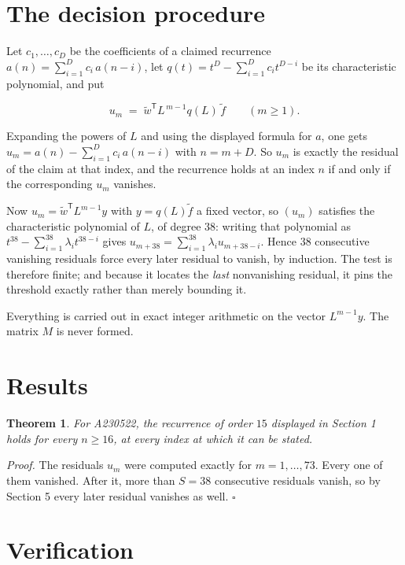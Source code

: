 \documentclass[11pt]{article}
\newtheorem{theorem}{Theorem}
\theoremstyle{definition}
\begin{document}
\section{The decision procedure}

Let $c_1,\dots,c_D$ be the coefficients of a claimed recurrence $a(n) = \sum_{i=1}^{D} c_i\,a(n-i)$, let $q(t) = t^{D} - \sum_{i=1}^{D} c_i t^{D-i}$ be its characteristic polynomial, and put

\[u_m \;=\; \tilde w^{\mathsf T} L^{\,m-1} q(L)\,\tilde f \qquad (m \ge 1).\]

Expanding the powers of $L$ and using the displayed formula for $a$, one gets $u_m = a(n) - \sum_{i=1}^{D} c_i\,a(n-i)$ with $n = m + D$. So $u_m$ is exactly the residual of the claim at that index, and the recurrence holds at an index $n$ if and only if the corresponding $u_m$ vanishes.

Now $u_m = \tilde w^{\mathsf T} L^{m-1} y$ with $y = q(L)\tilde f$ a fixed vector, so $(u_m)$ satisfies the characteristic polynomial of $L$, of degree $38$: writing that polynomial as $t^{38} - \sum_{i=1}^{38} \lambda_i t^{38-i}$ gives $u_{m+38} = \sum_{i=1}^{38} \lambda_i u_{m+38-i}$. Hence $38$ consecutive vanishing residuals force every later residual to vanish, by induction. The test is therefore finite; and because it locates the {\itshape last} nonvanishing residual, it pins the threshold exactly rather than merely bounding it.

Everything is carried out in exact integer arithmetic on the vector $L^{m-1}y$. The matrix $M$ is never formed.

\section{Results}

\begin{theorem} For A230522, the recurrence of order $15$ displayed in Section 1 holds for every $n \ge 16$, at every index at which it can be stated.\end{theorem}

{\itshape Proof.} The residuals $u_m$ were computed exactly for $m = 1,\dots,73$. Every one of them vanished. After it, more than $S = 38$ consecutive residuals vanish, so by Section 5 every later residual vanishes as well. $\square$

\section{Verification}
\end{document}
